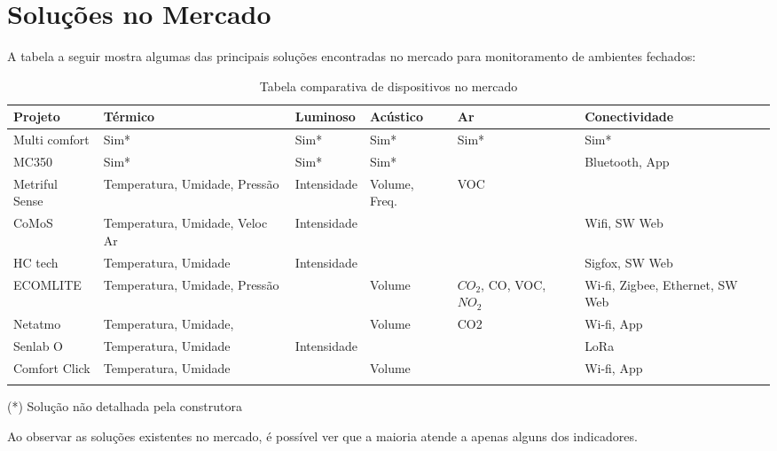 \documentclass[../monografia.tex]{subfiles}
\begin{document}
\section{Soluções no Mercado} 

A tabela a seguir mostra algumas das principais soluções encontradas no mercado para monitoramento de ambientes fechados: 

\begin{center}
\begin{longtable}{ | m{2.5cm} | m{2.4cm}| m{2.2cm} |m{2cm} |m{2cm} |m{2.8cm} | } 
\hline
\textbf{Projeto} & \textbf{Térmico} & \textbf{Luminoso} & \textbf{Acústico} & \textbf{Ar} & \textbf{Conectividade} \\ 
\hline
Multi comfort \cite{multicomfort} & Sim* & Sim* & Sim* & Sim* & Sim* \\
\hline
MC350\cite{mc350} & Sim* & Sim* & Sim* & & Bluetooth, App \\
\hline
Metriful Sense\cite{metriful} & Temperatura, Umidade, Pressão & Intensidade & Volume, Freq. & VOC & \\
\hline
CoMoS\cite{CoMoS} & Temperatura, Umidade, Veloc Ar & Intensidade & & & Wifi, SW Web \\ 
\hline
HC tech\cite{HCTech} & Temperatura, Umidade & Intensidade & & & Sigfox, SW Web\\ 
\hline
ECOMLITE \cite{ECOMLITE} & Temperatura, Umidade, Pressão & & Volume & $CO_{2}$, CO, VOC, $NO_{2}$ & Wi-fi, Zigbee, Ethernet, SW Web \\ 
\hline
Netatmo\cite{netatmo} & Temperatura, Umidade, & & Volume & CO2 & Wi-fi, App\\ 
\hline
Senlab O\cite{Senlab} & Temperatura, Umidade & Intensidade & & & LoRa \\ \hline
Comfort Click\cite{comfortclick} & Temperatura, Umidade & & Volume & & Wi-fi, App\\ 
\hline
\caption{Tabela comparativa de dispositivos no mercado}
\label{table}
\end{longtable}
\end{center}

\begin{flushright}
(*) Solução não detalhada pela construtora
\end{flushright}


Ao observar as soluções existentes no mercado, é possível ver que a maioria atende a apenas alguns dos indicadores. 
\end{document}
